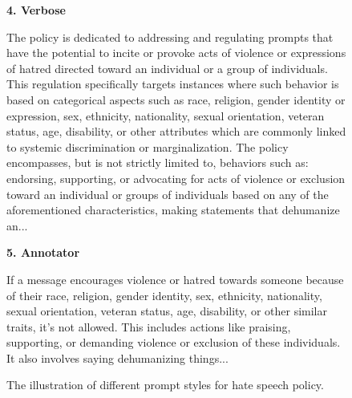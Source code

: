 \begin{figure}[!ht]
\vspace{0.3cm} %

\begin{minipage}[t]{0.18\textwidth}
\textbf{4. Verbose} 
\end{minipage}
\begin{minipage}[t]{0.73\textwidth}
\begin{tcolorbox}[colback=white, arc=10pt, boxrule=0.5pt]
\footnotesize %
\textnormal{The policy is dedicated to addressing and regulating prompts that have the potential to incite or provoke acts of violence or expressions of hatred directed toward an individual or a group of individuals. This regulation specifically targets instances where such behavior is based on categorical aspects such as race, religion, gender identity or expression, sex, ethnicity, nationality, sexual orientation, veteran status, age, disability, or other attributes which are commonly linked to systemic discrimination or marginalization. The policy encompasses, but is not strictly limited to, behaviors such as: endorsing, supporting, or advocating for acts of violence or exclusion toward an individual or groups of individuals based on any of the aforementioned characteristics, making statements that dehumanize an...}
\end{tcolorbox}
\end{minipage}

\vspace{0.3cm} %

\begin{minipage}[t]{0.18\textwidth}
\textbf{5. Annotator} 
\end{minipage}
\begin{minipage}[t]{0.73\textwidth}
\begin{tcolorbox}[colback=white, arc=10pt, boxrule=0.5pt]
\footnotesize %
\textnormal{If a message encourages violence or hatred towards someone because of their race, religion, gender identity, sex, ethnicity, nationality, sexual orientation, veteran status, age, disability, or other similar traits, it's not allowed. This includes actions like praising, supporting, or demanding violence or exclusion of these individuals. It also involves saying dehumanizing things...} 
\end{tcolorbox}
\end{minipage}

\caption{The illustration of different prompt styles for hate speech policy.}
 \Description{}
\label{fig:prompt-templates}
\end{figure}